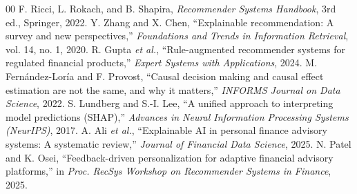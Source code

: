 \documentclass[conference]{IEEEtran}
\begin{document}
\begin{thebibliography}{00}
 F. Ricci, L. Rokach, and B. Shapira, \textit{Recommender Systems Handbook}, 3rd ed., Springer, 2022.
 Y. Zhang and X. Chen, ``Explainable recommendation: A survey and new perspectives,'' \textit{Foundations and Trends in Information Retrieval}, vol. 14, no. 1, 2020.
 R. Gupta \textit{et al.}, ``Rule-augmented recommender systems for regulated financial products,'' \textit{Expert Systems with Applications}, 2024.
 M. Fern\'andez-Lor\'ia and F. Provost, ``Causal decision making and causal effect estimation are not the same, and why it matters,'' \textit{INFORMS Journal on Data Science}, 2022.
 S. Lundberg and S.-I. Lee, ``A unified approach to interpreting model predictions (SHAP),'' \textit{Advances in Neural Information Processing Systems (NeurIPS)}, 2017.
 A. Ali \textit{et al.}, ``Explainable AI in personal finance advisory systems: A systematic review,'' \textit{Journal of Financial Data Science}, 2025.
 N. Patel and K. Osei, ``Feedback-driven personalization for adaptive financial advisory platforms,'' in \textit{Proc. RecSys Workshop on Recommender Systems in Finance}, 2025.

\end{thebibliography}
\end{document}
